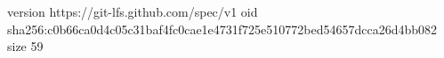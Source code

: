version https://git-lfs.github.com/spec/v1
oid sha256:c0b66ca0d4c05c31baf4fc0cae1e4731f725e510772bed54657dcca26d4bb082
size 59
